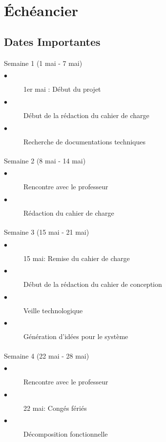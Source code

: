 \section{Échéancier}

	\subsection{Dates Importantes}
	
		\begin{multicols}{2}

		\paragraph{}
		Semaine 1 (1 mai - 7 mai)
			\begin{description}
				\item[$\bullet$] 1er mai : Début du projet
				\item[$\bullet$] Début de la rédaction du cahier de charge
				\item[$\bullet$] Recherche de documentations techniques
			\end{description}
	
		\paragraph{}
		Semaine 2 (8 mai - 14 mai)
			\begin{description}
				\item[$\bullet$] Rencontre avec le professeur
				\item[$\bullet$] Rédaction du cahier de charge
			\end{description}
		
		\paragraph{}
		Semaine 3 (15 mai - 21 mai)
			\begin{description}
				\item[$\bullet$] 15 mai: Remise du cahier de charge
				\item[$\bullet$] Début de la rédaction du cahier de conception
				\item[$\bullet$] Veille technologique
				\item[$\bullet$] Génération d'idées pour le système					
			\end{description}
		
		\paragraph{}
		Semaine 4 (22 mai - 28 mai)
			\begin{description}
				\item[$\bullet$] Rencontre avec le professeur
				\item[$\bullet$] 22 mai: Congés fériés				
				\item[$\bullet$] Décomposition fonctionnelle
				

\end{description}
\end{multicols}
